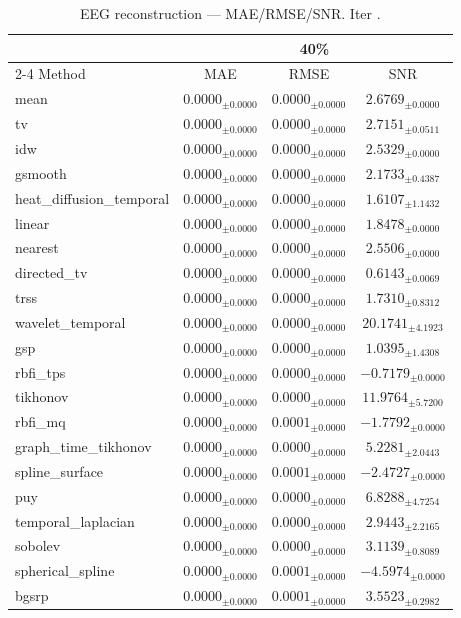 ﻿%
\begin{table}[ht]
\centering
\caption[EEG reconstruction - Iteration it39]{EEG reconstruction — MAE/RMSE/SNR. Iter .}
\label{tab:main_it39_physionet_gaussian_nnk_knn}
\small
\begin{tabular}{lccc}
\toprule
\multicolumn{1}{c}{} & \multicolumn{3}{c}{40\%} \\
\cmidrule(lr){2-4}
Method & MAE & RMSE & SNR \\
\midrule
mean & $0.0000_{\pm 0.0000}$ & $0.0000_{\pm 0.0000}$ & $2.6769_{\pm 0.0000}$ \\
tv & $0.0000_{\pm 0.0000}$ & $0.0000_{\pm 0.0000}$ & $2.7151_{\pm 0.0511}$ \\
idw & $0.0000_{\pm 0.0000}$ & $0.0000_{\pm 0.0000}$ & $2.5329_{\pm 0.0000}$ \\
gsmooth & $0.0000_{\pm 0.0000}$ & $0.0000_{\pm 0.0000}$ & $2.1733_{\pm 0.4387}$ \\
heat\_diffusion\_temporal & $0.0000_{\pm 0.0000}$ & $0.0000_{\pm 0.0000}$ & $1.6107_{\pm 1.1432}$ \\
linear & $0.0000_{\pm 0.0000}$ & $0.0000_{\pm 0.0000}$ & $1.8478_{\pm 0.0000}$ \\
nearest & $0.0000_{\pm 0.0000}$ & $0.0000_{\pm 0.0000}$ & $2.5506_{\pm 0.0000}$ \\
directed\_tv & $0.0000_{\pm 0.0000}$ & $0.0000_{\pm 0.0000}$ & $0.6143_{\pm 0.0069}$ \\
trss & $0.0000_{\pm 0.0000}$ & $0.0000_{\pm 0.0000}$ & $1.7310_{\pm 0.8312}$ \\
wavelet\_temporal & $0.0000_{\pm 0.0000}$ & $0.0000_{\pm 0.0000}$ & $20.1741_{\pm 4.1923}$ \\
gsp & $0.0000_{\pm 0.0000}$ & $0.0000_{\pm 0.0000}$ & $1.0395_{\pm 1.4308}$ \\
rbfi\_tps & $0.0000_{\pm 0.0000}$ & $0.0000_{\pm 0.0000}$ & $-0.7179_{\pm 0.0000}$ \\
tikhonov & $0.0000_{\pm 0.0000}$ & $0.0000_{\pm 0.0000}$ & $11.9764_{\pm 5.7200}$ \\
rbfi\_mq & $0.0000_{\pm 0.0000}$ & $0.0001_{\pm 0.0000}$ & $-1.7792_{\pm 0.0000}$ \\
graph\_time\_tikhonov & $0.0000_{\pm 0.0000}$ & $0.0000_{\pm 0.0000}$ & $5.2281_{\pm 2.0443}$ \\
spline\_surface & $0.0000_{\pm 0.0000}$ & $0.0001_{\pm 0.0000}$ & $-2.4727_{\pm 0.0000}$ \\
puy & $0.0000_{\pm 0.0000}$ & $0.0000_{\pm 0.0000}$ & $6.8288_{\pm 4.7254}$ \\
temporal\_laplacian & $0.0000_{\pm 0.0000}$ & $0.0000_{\pm 0.0000}$ & $2.9443_{\pm 2.2165}$ \\
sobolev & $0.0000_{\pm 0.0000}$ & $0.0000_{\pm 0.0000}$ & $3.1139_{\pm 0.8089}$ \\
spherical\_spline & $0.0000_{\pm 0.0000}$ & $0.0001_{\pm 0.0000}$ & $-4.5974_{\pm 0.0000}$ \\
bgsrp & $0.0000_{\pm 0.0000}$ & $0.0001_{\pm 0.0000}$ & $3.5523_{\pm 0.2982}$ \\
\bottomrule
\end{tabular}
\end{table}







